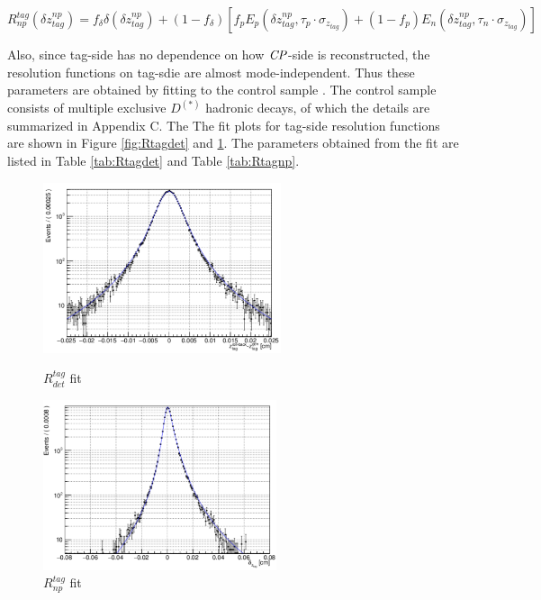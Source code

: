 \begin{equation}\label{eq:Rnp}
R_{np}^{tag}(\delta z_{tag}^{np})=f_{\delta}\delta(\delta z_{tag}^{np}) + 
(1-f_{\delta})[f_p E_p(\delta z_{tag}^{np},\tau_p\cdot \sigma_{z_{tag}}) +
(1-f_p)E_n(\delta z_{tag}^{np},\tau_n\cdot \sigma_{z_{tag}}) ]
\end{equation} 


Also, since tag-side has no dependence on how $\it{CP}$-side is reconstructed, the resolution functions on tag-sdie are almost mode-independent. Thus these parameters are obtained by fitting to the control sample . The control sample consists of multiple exclusive $D^{(*)}$ hadronic decays, of which the details are summarized in Appendix C. The  The fit plots for tag-side resolution functions are shown in Figure \ref{fig:Rtagdet} and \ref{fig:Rtagnp}. The parameters obtained from the fit are listed in Table \ref{tab:Rtagdet} and Table \ref{tab:Rtagnp}.


\begin{figure}[H]
	\begin{minipage}[b]{0.5\linewidth}
		\centering
		\includegraphics[height=5cm]{figures/Rdet}
		\caption{$R_{det}^{tag} $ fit}
		\label{fig:Rtagdet}
	\end{minipage}
	\begin{minipage}[b]{0.5\linewidth}
		\centering
		\includegraphics[height=5cm]{figures/Rnp}
		\caption{$R_{np}^{tag}$ fit}
		\label{fig:Rtagnp}
	\end{minipage}
\end{figure}

